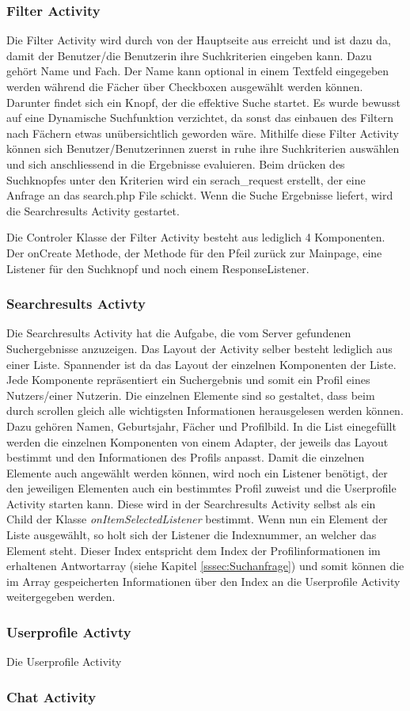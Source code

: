 \documentclass[a4paper,11pt]{report}
\begin{document}
				\subsubsection{Filter Activity} \label{filter:act}
				Die Filter Activity wird durch von der Hauptseite aus erreicht und ist dazu da, damit der Benutzer/die Benutzerin ihre Suchkriterien eingeben kann. Dazu gehört Name und Fach. Der Name kann optional in einem Textfeld eingegeben werden während die Fächer über Checkboxen ausgewählt werden können. Darunter findet sich ein Knopf, der die effektive Suche startet. Es wurde bewusst auf eine Dynamische Suchfunktion verzichtet, da sonst das einbauen des Filtern nach Fächern etwas unübersichtlich geworden wäre. Mithilfe diese Filter Activity können sich Benutzer/Benutzerinnen zuerst in ruhe ihre Suchkriterien auswählen und sich anschliessend in die Ergebnisse evaluieren. Beim drücken des Suchknopfes unter den Kriterien wird ein serach\_request erstellt, der eine Anfrage an das search.php File schickt. Wenn die Suche Ergebnisse liefert, wird die Searchresults Activity gestartet.
				
				Die Controler Klasse der Filter Activity besteht aus lediglich 4 Komponenten. Der onCreate Methode, der Methode für den Pfeil zurück zur Mainpage, eine Listener für den Suchknopf und noch einem ResponseListener.
				\subsubsection{Searchresults Activty}
				Die Searchresults Activity hat die Aufgabe, die vom Server gefundenen Suchergebnisse anzuzeigen. Das Layout der Activity selber besteht lediglich aus einer Liste. Spannender ist da das Layout der einzelnen Komponenten der Liste. Jede Komponente repräsentiert ein Suchergebnis und somit ein Profil eines Nutzers/einer Nutzerin. Die einzelnen Elemente sind so gestaltet, dass beim durch scrollen gleich alle wichtigsten Informationen herausgelesen werden können. Dazu gehören Namen, Geburtsjahr, Fächer und Profilbild. In die List einegefüllt werden die einzelnen Komponenten von einem Adapter, der jeweils das Layout bestimmt und den Informationen des Profils anpasst. Damit die einzelnen Elemente auch angewählt werden können, wird noch ein Listener benötigt, der den jeweiligen Elementen auch ein bestimmtes Profil zuweist und die Userprofile Activity starten kann. Diese wird in der Searchresults Activity selbst als ein Child der Klasse \emph{onItemSelectedListener} bestimmt. Wenn nun ein Element der Liste ausgewählt, so holt sich der Listener die Indexnummer, an welcher das Element steht. Dieser Index entspricht dem Index der Profilinformationen im erhaltenen Antwortarray (siehe Kapitel \ref{sssec:Suchanfrage}) und somit können die im Array gespeicherten Informationen über den Index an die Userprofile Activity weitergegeben werden.
				\subsubsection{Userprofile Activty}
				Die Userprofile Activity 
				\subsubsection{Chat Activity} \label{chat:act}
		
\newpage
	
	
\end{document}
